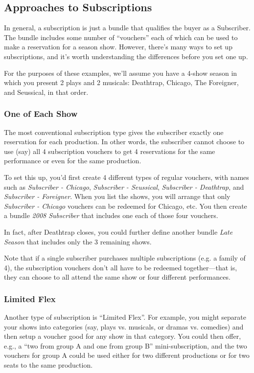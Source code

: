 \subsection{Approaches to Subscriptions}
\label{sec:subscriptions}

In general, a subscription is just a bundle that qualifies the buyer as
a Subscriber.  The bundle includes some number of ``vouchers'' each of
which can be used to make a reservation for a season show.  However,
there's many ways to set up subscriptions, and it's worth understanding
the differences before you set one up.

For the purposes of these examples, we'll assume you have a 4-show
season in which you present 2 plays and 2 musicals: Deathtrap, Chicago,
The Foreigner, and Seussical, in that order.

\subsubsection{One of Each Show}

The most conventional subscription type gives the subscriber exactly one
reservation for each production.  In other words, the subscriber cannot
choose to use (say) all 4 subscription vouchers to get 4 reservations
for the same performance or even for the same production.

To set this up, you'd first create 4 different types of regular
vouchers, with names such as  \emph{Subscriber - Chicago}, \emph{Subscriber -
Seussical}, \emph{Subscriber - Deathtrap}, and \emph{Subscriber -
Foreigner}.  When you list the shows, you will arrange that only
\emph{Subscriber - Chicago} vouchers can be redeemed for Chicago, etc.  You
then create a bundle \emph{2008 Subscriber} that includes one each of
those four vouchers.

In fact, after Deathtrap closes, you could further
define another bundle \emph{Late Season} that includes only the 3
remaining shows.

Note that if a single subscriber purchases multiple subscriptions
(e.g. a family of 4), the subscription vouchers don't all have to be
redeemed together---that is, they can choose to all attend the same show
or four different performances.

\subsubsection{Limited Flex}

Another type of subscription is ``Limited Flex''.  For example, you
might separate your shows into categories (say, plays vs. musicals, or
dramas vs. comedies) and then setup a voucher good for any show in that
category.  You could then offer, e.g., a ``two from group A and one from
group B'' mini-subscription, and the two vouchers for group A could be
used either for two different productions or for two seats to the same
production. 

